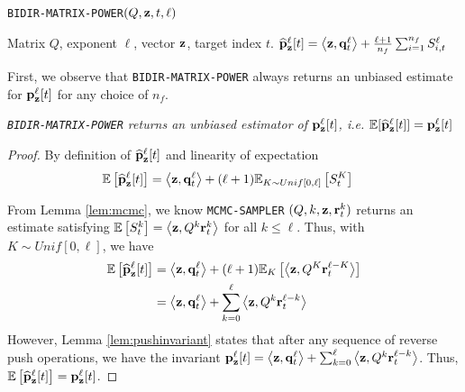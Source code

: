 \begin{algorithm}[ht]
\caption{\texttt{BIDIR-MATRIX-POWER}$(Q, \mathbf{z}, t,\ell)$}
\label{alg:linearsysest}
\begin{algorithmic}[1]
\REQUIRE Matrix $Q$, exponent $\ell$, vector $\mathbf{z}$, target index $t$.
\ENDFOR
\RETURN $\widehat{\mathbf{p}}_\mathbf{z}^{\ell}[t] = \left< \mathbf{z}, \mathbf{q}^{\ell}_t \right> + \frac{\ell+1}{n_f} \sum_{i=1}^{n_f}S_{i,t}^\ell$
\end{algorithmic}
\end{algorithm} 

First, we observe that \texttt{BIDIR-MATRIX-POWER} always returns an unbiased estimate for ${\mathbf{p}}_\mathbf{z}^{\ell}[t]$ for any choice of $n_f$.

\begin{lemma}
\label{lem:unbiased}
\emph{
\texttt{BIDIR-MATRIX-POWER} returns an unbiased estimator of ${\mathbf{p}}_\mathbf{z}^{\ell}[t]$, i.e. $\mathbb{E}[\widehat{\mathbf{p}}_\mathbf{z}^{\ell}[t]] = {\mathbf{p}}_\mathbf{z}^{\ell}[t]$
}
\end{lemma}

\begin{proof}
By definition of $\widehat{\mathbf{p}}_\mathbf{z}^{\ell}[t]$ and linearity of expectation
\begin{align*}
\mathbb{E}\left[\widehat{\mathbf{p}}_\mathbf{z}^{\ell}[t]\right] 
&= \left<\mathbf{z}, \mathbf{q}_t^{\ell} \right> + (\ell+1)\mathbb{E}_{K \sim Unif[0, \ell]}\left[S_{t}^{K}\right]
\end{align*}

From Lemma \ref{lem:mcmc}, we know \texttt{MCMC-SAMPLER} $(Q, k, \mathbf{z}, \mathbf{r}^{k}_t)$ returns an estimate satisfying $\mathbb{E}\left[S_{t}^{k}\right] = \left< \mathbf{z}, Q^k \mathbf{r}^{k}_t \right>$ for all $k\leq \ell$. Thus, with $K \sim Unif[0, \ell]$, we have
\begin{align*}
\mathbb{E}\left[\widehat{\mathbf{p}}_\mathbf{z}^{\ell}[t] \right] &= \left<\mathbf{z}, \mathbf{q}_t^{\ell} \right> + (\ell+1)\mathbb{E}_K\left[\left< \mathbf{z}, Q^K \mathbf{r}_t^{\ell-K} \right> \right] \\
&= \left<\mathbf{z}, \mathbf{q}_t^{\ell} \right> + \sum_{k = 0}^\ell\left< \mathbf{z}, Q^k \mathbf{r}_t^{\ell-k} \right>
\end{align*}
However, Lemma \ref{lem:pushinvariant} states that after any sequence of reverse push operations, we have the invariant ${\mathbf{p}}_\mathbf{z}^{\ell}[t] = \left<\mathbf{z}, \mathbf{q}_t^{\ell} \right> + \sum_{k=0}^{\ell} \left<\mathbf{z}, Q^k\mathbf{r}_t^{\ell-k}\right>$. Thus, $\mathbb{E}\left[\widehat{\mathbf{p}}_\mathbf{z}^{\ell}[t] \right] = {\mathbf{p}}_\mathbf{z}^{\ell}[t]$.
\end{proof}

